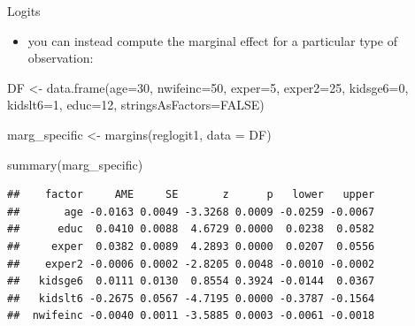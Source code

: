 \documentclass[
  ignorenonframetext,
]{beamer}
\newenvironment{Shaded}{\begin{snugshade}}{\end{snugshade}}
\newcommand{\AttributeTok}[1]{\textcolor[rgb]{0.77,0.63,0.00}{#1}}
\newcommand{\ConstantTok}[1]{\textcolor[rgb]{0.00,0.00,0.00}{#1}}
\newcommand{\DecValTok}[1]{\textcolor[rgb]{0.00,0.00,0.81}{#1}}
\newcommand{\FunctionTok}[1]{\textcolor[rgb]{0.00,0.00,0.00}{#1}}
\newcommand{\NormalTok}[1]{#1}
\newcommand{\OtherTok}[1]{\textcolor[rgb]{0.56,0.35,0.01}{#1}}
\providecommand{\tightlist}{%
  \setlength{\itemsep}{0pt}\setlength{\parskip}{0pt}}
\begin{document}
\begin{frame}[fragile]{Logits}
\protect\hypertarget{logits-8}{}
\begin{itemize}
\tightlist
\item
  you can instead compute the marginal effect for a particular type of
  observation:
\end{itemize}

\tiny

\begin{Shaded}
\begin{Highlighting}[]
\NormalTok{DF }\OtherTok{\textless{}{-}} \FunctionTok{data.frame}\NormalTok{(}\AttributeTok{age=}\DecValTok{30}\NormalTok{, }
                 \AttributeTok{nwifeinc=}\DecValTok{50}\NormalTok{,}
                 \AttributeTok{exper=}\DecValTok{5}\NormalTok{,}
                 \AttributeTok{exper2=}\DecValTok{25}\NormalTok{,}
                 \AttributeTok{kidsge6=}\DecValTok{0}\NormalTok{,}
                 \AttributeTok{kidslt6=}\DecValTok{1}\NormalTok{,}
                 \AttributeTok{educ=}\DecValTok{12}\NormalTok{,}
                 \AttributeTok{stringsAsFactors=}\ConstantTok{FALSE}\NormalTok{)}
              
\NormalTok{marg\_specific }\OtherTok{\textless{}{-}} \FunctionTok{margins}\NormalTok{(reglogit1, }\AttributeTok{data =}\NormalTok{ DF)}

\FunctionTok{summary}\NormalTok{(marg\_specific)}
\end{Highlighting}
\end{Shaded}

\begin{verbatim}
##    factor     AME     SE       z      p   lower   upper
##       age -0.0163 0.0049 -3.3268 0.0009 -0.0259 -0.0067
##      educ  0.0410 0.0088  4.6729 0.0000  0.0238  0.0582
##     exper  0.0382 0.0089  4.2893 0.0000  0.0207  0.0556
##    exper2 -0.0006 0.0002 -2.8205 0.0048 -0.0010 -0.0002
##   kidsge6  0.0111 0.0130  0.8554 0.3924 -0.0144  0.0367
##   kidslt6 -0.2675 0.0567 -4.7195 0.0000 -0.3787 -0.1564
##  nwifeinc -0.0040 0.0011 -3.5885 0.0003 -0.0061 -0.0018
\end{verbatim}
\end{frame}
\end{document}
